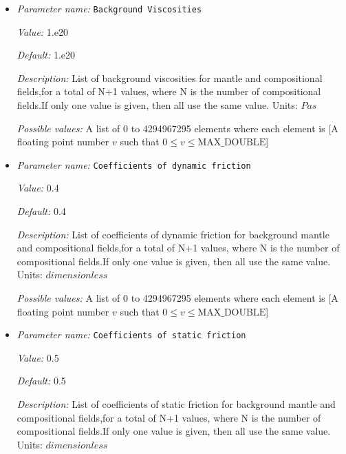 \begin{itemize}
\item {\it Parameter name:} {\tt Background Viscosities}
\label{parameters:Material model/Dynamic Friction/Viscosities/Background Viscosities}


{\it Value:} 1.e20


{\it Default:} 1.e20


{\it Description:} List of background viscosities for mantle and compositional fields,for a total of N+1 values, where N is the number of compositional fields.If only one value is given, then all use the same value. Units: $Pa s $


{\it Possible values:} A list of 0 to 4294967295 elements where each element is [A floating point number $v$ such that $0 \leq v \leq \text{MAX\_DOUBLE}$]
\item {\it Parameter name:} {\tt Coefficients of dynamic friction}
\label{parameters:Material model/Dynamic Friction/Viscosities/Coefficients of dynamic friction}


{\it Value:} 0.4


{\it Default:} 0.4


{\it Description:} List of coefficients of dynamic friction for background mantle and compositional fields,for a total of N+1 values, where N is the number of compositional fields.If only one value is given, then all use the same value. Units: $dimensionless$


{\it Possible values:} A list of 0 to 4294967295 elements where each element is [A floating point number $v$ such that $0 \leq v \leq \text{MAX\_DOUBLE}$]
\item {\it Parameter name:} {\tt Coefficients of static friction}
\label{parameters:Material model/Dynamic Friction/Viscosities/Coefficients of static friction}


{\it Value:} 0.5


{\it Default:} 0.5


{\it Description:} List of coefficients of static friction for background mantle and compositional fields,for a total of N+1 values, where N is the number of compositional fields.If only one value is given, then all use the same value. Units: $dimensionless$



\end{itemize}
